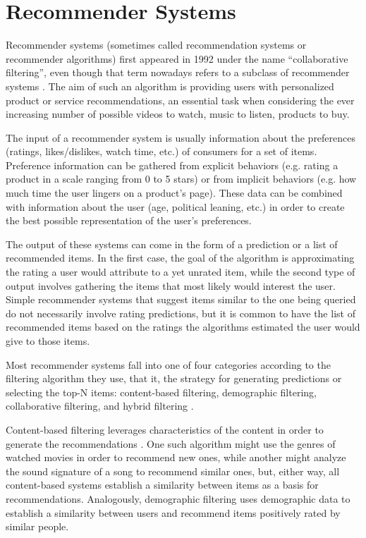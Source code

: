 \section{Recommender Systems}
\label{sec:recommender_systems}

Recommender systems (sometimes called recommendation systems or recommender
algorithms) first appeared in 1992 under the name ``collaborative filtering'',
even though that term nowadays refers to a subclass of recommender systems
\citep{goldberg_using_1992}. The aim of such an algorithm is providing users
with personalized product or service recommendations, an essential task when
considering the ever increasing number of possible videos to watch, music to
listen, products to buy.

The input of a recommender system is usually information about the preferences
(ratings, likes/dislikes, watch time, etc.) of consumers for a set of items.
Preference information can be gathered from explicit behaviors (e.g. rating a
product in a scale ranging from 0 to 5 stars) or from implicit behaviors (e.g.
how much time the user lingers on a product's page). These data can be combined
with information about the user (age, political leaning, etc.) in order to
create the best possible representation of the user's preferences.

The output of these systems can come in the form of a prediction or a list of
recommended items. In the first case, the goal of the algorithm is approximating
the rating a user would attribute to a yet unrated item, while the second type
of output involves gathering the items that most likely would interest the user.
Simple recommender systems that suggest items similar to the one being queried
do not necessarily involve rating predictions, but it is common to have the list
of recommended items based on the ratings the algorithms estimated the user
would give to those items.

Most recommender systems fall into one of four categories according to the
filtering algorithm they use, that it, the strategy for generating predictions
or selecting the top-N items: content-based filtering, demographic filtering,
collaborative filtering, and hybrid filtering
\citep{bobadilla_recommender_2013}.

Content-based filtering leverages characteristics of the content in order to
generate the recommendations \citep{ricci_introduction_2011}. One such algorithm
might use the genres of watched movies in order to recommend new ones, while
another might analyze the sound signature of a song to recommend similar ones,
but, either way, all content-based systems establish a similarity between items
as a basis for recommendations. Analogously, demographic filtering uses
demographic data to establish a similarity between users and recommend items
positively rated by similar people.

